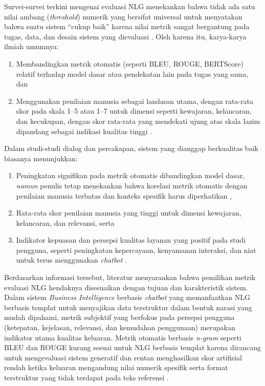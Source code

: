 Survei-survei terkini mengenai evaluasi NLG menekankan bahwa tidak ada satu nilai ambang (\textit{threshold}) numerik yang bersifat universal untuk menyatakan bahwa suatu sistem ``cukup baik'' karena nilai metrik sangat bergantung pada tugas, data, dan desain sistem yang dievaluasi \autocite{Celikyilmaz2020EvalTextGen,Sai2020NLGSurvey,Gao2024LLMNLG}. Oleh karena itu, karya-karya ilmiah umumnya:
\begin{enumerate}[label=\alph*.]
    \item Membandingkan metrik otomatis (seperti BLEU, ROUGE, BERTScore) relatif terhadap model dasar atau pendekatan lain pada tugas yang sama, dan
    \item Menggunakan penilaian manusia sebagai landasan utama, dengan rata-rata skor pada skala 1--5 atau 1--7 untuk dimensi seperti kewajaran, kelancaran, dan kecukupan, dengan skor rata-rata yang mendekati ujung atas skala lazim dipandang sebagai indikasi kualitas tinggi \autocite{vanDerLee2021HumanEval,Celikyilmaz2020EvalTextGen}.
\end{enumerate}

Dalam studi-studi dialog dan percakapan, sistem yang dianggap berkualitas baik biasanya menunjukkan:
\begin{enumerate}[label=\alph*.]
    \item Peningkatan signifikan pada metrik otomatis dibandingkan model dasar, \textit{namun} penulis tetap menekankan bahwa korelasi metrik otomatis dengan penilaian manusia terbatas dan konteks spesifik harus diperhatikan \autocite{Sai2020NLGSurvey,Xiao2023MetricEval},
    \item Rata-rata skor penilaian manusia yang tinggi untuk dimensi kewajaran, kelancaran, dan relevansi, serta
    \item Indikator kepuasan dan persepsi kualitas layanan yang positif pada studi pengguna, seperti peningkatan kepercayaan, kenyamanan interaksi, dan niat untuk terus menggunakan \textit{chatbot} \autocite{Syarifudin2024AIChatbotQuality,hsu2023chatbotsatisfaction}.
\end{enumerate}

Berdasarkan informasi tersebut, literatur menyarankan bahwa pemilihan metrik evaluasi NLG hendaknya disesuaikan dengan tujuan dan karakteristik sistem. Dalam sistem \textit{Business Intelligence} berbasis \textit{chatbot} yang memanfaatkan NLG berbasis templat untuk menyajikan data terstruktur dalam bentuk narasi yang mudah dipahami, metrik subjektif yang berfokus pada persepsi pengguna (ketepatan, kejelasan, relevansi, dan kemudahan penggunaan) merupakan indikator utama kualitas keluaran. Metrik otomatis berbasis \textit{n-gram} seperti BLEU dan ROUGE kurang sesuai untuk NLG berbasis templat karena dirancang untuk mengevaluasi sistem generatif dan rentan menghasilkan skor artifisial rendah ketika keluaran mengandung nilai numerik spesifik serta format terstruktur yang tidak terdapat pada teks referensi \autocite{Celikyilmaz2020EvalTextGen,vanDerLee2021HumanEval}.

